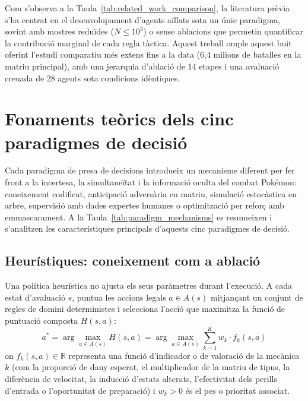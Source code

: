 
Com s'observa a la Taula~\ref{tab:related_work_comparison}, la literatura prèvia s'ha centrat en el desenvolupament d'agents aïllats sota un únic paradigma, sovint amb mostres reduïdes ($N \le 10^3$) o sense ablacions que permetin quantificar la contribució marginal de cada regla tàctica. Aquest treball omple aquest buit oferint l'estudi comparatiu més extens fins a la data (6,4 milions de batalles en la matriu principal), amb una jerarquia d'ablació de 14 etapes i una avaluació creuada de 28 agents sota condicions idèntiques.

\section{Fonaments teòrics dels cinc paradigmes de decisió}
\label{sec:ia_tecniques}

Cada paradigma de presa de decisions introdueix un mecanisme diferent per fer front a la incertesa, la simultaneïtat i la informació oculta del combat Pokémon: coneixement codificat, anticipació adversària en matriu, simulació estocàstica en arbre, supervisió amb dades expertes humanes o optimització per reforç amb emmascarament. A la Taula~\ref{tab:paradigm_mechanisms} es resumeixen i s'analitzen les característiques principals d'aquests cinc paradigmes de decisió.



\subsection{Heurístiques: coneixement com a ablació}
\label{subsec:teoria_heuristiques}

Una política heurística no ajusta els seus paràmetres durant l'execució. A cada estat d'avaluació $s$, puntua les accions legals $a \in A(s)$ mitjançant un conjunt de regles de domini deterministes i selecciona l'acció que maximitza la funció de puntuació composta $H(s, a)$:
\begin{equation}
    a^* = \arg\max_{a \in A(s)} H(s, a) = \arg\max_{a \in A(s)} \sum_{k=1}^K w_k \cdot f_k(s, a)
    \label{eq:heuristic_scoring}
\end{equation}
on $f_k(s, a) \in \mathbb{R}$ representa una funció d'indicador o de valoració de la mecànica $k$ (com la proporció de dany esperat, el multiplicador de la matriu de tipus, la diferència de velocitat, la inducció d'estats alterats, l'efectivitat dels perills d'entrada o l'oportunitat de preparació) i $w_k > 0$ és el pes o prioritat associat.

